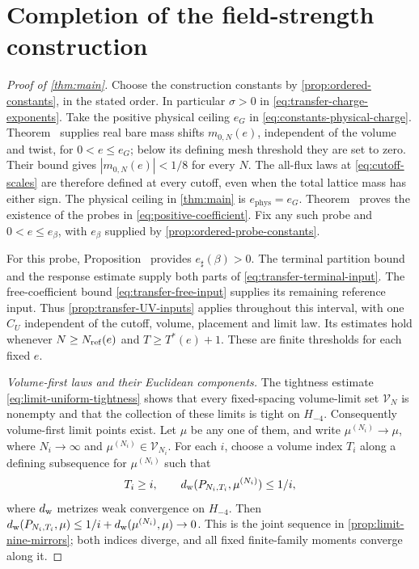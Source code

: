 \section{Completion of the field-strength construction}
\label{sec:main-theorem-closure}

\begin{proof}[Proof of \cref{thm:main}]
Choose the construction constants by \cref{prop:ordered-constants},
in the stated order.
In particular $\sigma>0$ in
\eqref{eq:transfer-charge-exponents}.
Take the positive physical ceiling $e_G$ in
\eqref{eq:constants-physical-charge}. Theorem~ supplies real bare mass shifts
$m_{0,N}(e)$, independent of the volume and twist,
for $0<e\le e_G$; below its defining mesh threshold they
are set to zero. Their bound
 gives
$|m_{0,N}(e)|<1/8$ for every $N$.
The all-flux laws at \eqref{eq:cutoff-scales} are therefore
defined at every cutoff, even when the total lattice mass
has either sign.
The physical ceiling in \cref{thm:main} is
$e_{\mathrm{phys}}=e_G$.
Theorem~ proves the existence
of the probes in \eqref{eq:positive-coefficient}.
Fix any such probe and $0<e\le e_\beta$, with
$e_\beta$ supplied by \cref{prop:ordered-probe-constants}.

For this probe,
Proposition~
provides $e_\sharp(\beta)>0$.
The terminal partition bound
 and the response estimate
 supply
both parts of \eqref{eq:transfer-terminal-input}.
The free-coefficient bound
\eqref{eq:transfer-free-input} supplies its remaining
reference input. Thus \cref{prop:transfer-UV-inputs}
applies throughout this interval, with one $C_U$
independent of the cutoff, volume, placement and limit law.
Its estimates hold whenever
$N\ge N_{\rm ref}(e)$ and $T\ge T^*(e)+1$.
These are finite thresholds for each fixed $e$.

\emph{Volume-first laws and their Euclidean components.}
The tightness estimate \eqref{eq:limit-uniform-tightness}
shows that every fixed-spacing volume-limit set
$\mathcal V_N$ is nonempty and that the collection of
these limits is tight on $H_{-4}$.
Consequently volume-first limit points exist.
Let $\mu$ be any one of them, and write
$\mu^{(N_i)}\to\mu$, where $N_i\to\infty$ and
$\mu^{(N_i)}\in\mathcal V_{N_i}$.
For each $i$, choose a volume index $T_i$ along a
defining subsequence for $\mu^{(N_i)}$ such that
\[
 T_i\ge i,\qquad
 d_{\rm w}(P_{N_i,T_i},\mu^{(N_i)})\le1/i,
\]
where $d_{\rm w}$ metrizes weak convergence on $H_{-4}$.
Then
$d_{\rm w}(P_{N_i,T_i},\mu)
\le1/i+d_{\rm w}(\mu^{(N_i)},\mu)\to0$.
This is the joint sequence in
\cref{prop:limit-nine-mirrors};
both indices diverge, and all fixed finite-family
moments converge along it.


\end{proof}
